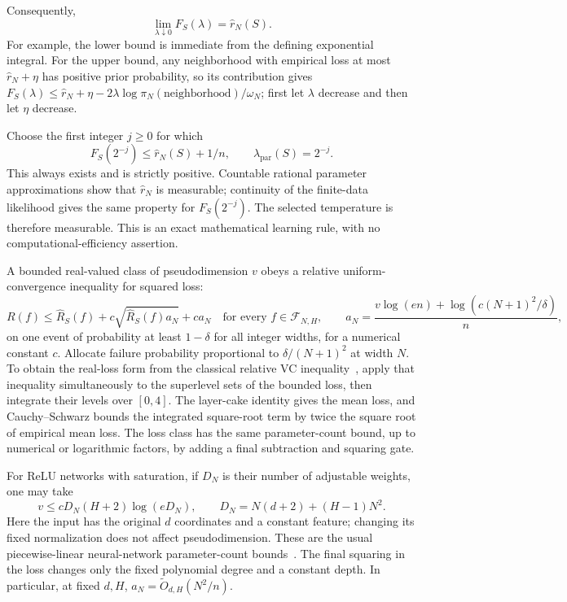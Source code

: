 Consequently,
\[
 \lim_{\lambda\downarrow0}F_S(\lambda)=\widehat r_N(S).
\]
For example, the lower bound is immediate from the defining exponential integral. For the upper bound, any neighborhood with empirical loss at most $\widehat r_N+\eta$ has positive prior probability, so its contribution gives
$F_S(\lambda)\le\widehat r_N+\eta-2\lambda\log\pi_N(\text{neighborhood})/\omega_N$; first let $\lambda$ decrease and then let $\eta$ decrease.

Choose the first integer $j\ge0$ for which
\begin{equation}
 F_S(2^{-j})\le\widehat r_N(S)+1/n,
 \qquad \lambda_{\mathrm{par}}(S)=2^{-j}.
 \label{eq:parameter-temperature}
\end{equation}
This always exists and is strictly positive. Countable rational parameter approximations show that $\widehat r_N$ is measurable; continuity of the finite-data likelihood gives the same property for $F_S(2^{-j})$. The selected temperature is therefore measurable. This is an exact mathematical learning rule, with no computational-efficiency assertion.

A bounded real-valued class of pseudodimension $v$ obeys a relative uniform-convergence inequality for squared loss:
\begin{equation}
 R(f)\le\widehat R_S(f)+c\sqrt{\widehat R_S(f)a_N}+ca_N
 \quad\text{for every }f\in\mathcal F_{N,H},
 \qquad
 a_N=\frac{v\log(en)+\log(c(N+1)^2/\delta)}n,
 \label{eq:relative-parameter-bound}
\end{equation}
on one event of probability at least $1-\delta$ for all integer widths, for a numerical constant $c$. Allocate failure probability proportional to $\delta/(N+1)^2$ at width $N$. To obtain the real-loss form from the classical relative VC inequality~\cite{vapnik}, apply that inequality simultaneously to the superlevel sets of the bounded loss, then integrate their levels over $[0,4]$. The layer-cake identity gives the mean loss, and Cauchy--Schwarz bounds the integrated square-root term by twice the square root of empirical mean loss. The loss class has the same parameter-count bound, up to numerical or logarithmic factors, by adding a final subtraction and squaring gate.

For ReLU networks with saturation, if $D_N$ is their number of adjustable weights, one may take
\[
 v\le c D_N(H+2)\log(eD_N),\qquad
 D_N=N(d+2)+(H-1)N^2.
\]
Here the input has the original $d$ coordinates and a constant feature; changing its fixed normalization does not affect pseudodimension. These are the usual piecewise-linear neural-network parameter-count bounds~\cite{bartlettvc}. The final squaring in the loss changes only the fixed polynomial degree and a constant depth. In particular, at fixed $d,H$, $a_N=\widetilde O_{d,H}(N^2/n)$.

